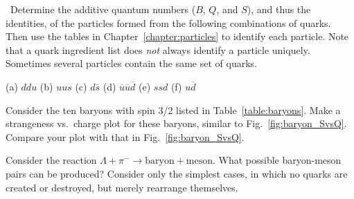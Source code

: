 \begin{problem}\
Determine the additive quantum numbers ($B$, $Q$, and $S$), and
  thus the identities, of the particles formed from the following
  combinations of quarks.  Then use the tables in
  Chapter~\ref{chapter:particles} to identify each particle.  Note that a
  quark ingredient list does {\em not} always identify a particle
  uniquely.  Sometimes several particles contain the same set of
  quarks.\par\medskip
  (a) $ddu$ \qquad (b) $uus$ \qquad (c) $d\overline s$
  \qquad (d) $\overline u\overline u\overline d$ \qquad (e) $ssd$
  \qquad (f) $u\overline d$
\label{prob:identify_from_quarks}
\end{problem}

\begin{problem}
Consider the ten baryons with spin 3/2 listed in
  Table~\ref{table:baryons}.  Make a strange\-ness vs.\ charge plot
  for these baryons, similar to Fig.~\ref{fig:baryon_SvsQ}.
  Compare your plot with that in Fig.~\ref{fig:baryon_SvsQ}.
\label{prob:strangeness_vs_charge_plot}
\end{problem}

\begin{problem}
Consider the reaction $\Lambda + \pi^- \to \mbox{baryon} +
  \mbox{meson}$.  What possible baryon-meson pairs can be produced?
  Consider only the simplest cases, in which no quarks are created or
  destroyed, but merely rearrange themselves.
\label{prob:reaction_products}
\end{problem}

\newpage
\thispagestyle{empty}

